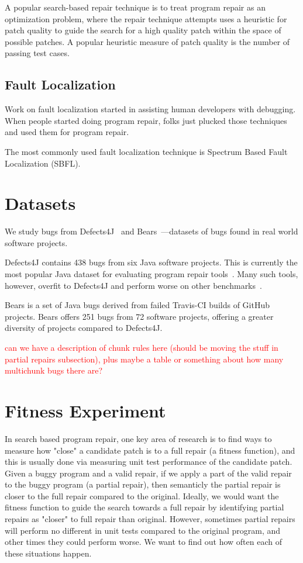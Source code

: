 \documentclass[sigconf, timestamp-false, anonymous=true]{acmart}
\newcommand\todo[1]{\textcolor{red}{#1}}
\begin{document}
A popular search-based repair technique is to treat program repair as an optimization 
problem, where the repair technique attempts uses a heuristic for patch quality to guide 
the search for a high quality patch within the space of possible patches. A popular heuristic
measure of patch quality is the number of passing test cases.

\subsection{Fault Localization}

Work on fault localization started in assisting human developers with debugging. When people started doing program repair, folks just plucked those techniques and used them for program repair. 

The most commonly used fault localization technique is Spectrum Based Fault Localization (SBFL). 

\section{Datasets}
We study bugs from Defects4J~\cite{defects4j} and Bears~\cite{bears}---datasets of 
bugs found in real world software projects.

Defects4J contains 438 bugs from six Java software projects. This  
is currently the most popular Java dataset for evaluating program repair tools~\cite{durieux-repair-them-all}.
Many such tools, however, overfit to Defects4J and perform worse on other 
benchmarks~\cite{durieux-repair-them-all}. 

Bears is a set of Java bugs derived from failed Travis-CI builds of GitHub projects.
Bears offers 251 bugs from 72 software projects, offering a greater diversity of 
projects compared to Defects4J.

\todo{can we have a description of chunk rules here (should be moving the stuff in partial repairs subsection), plus maybe a table or something about how many multichunk bugs there are?}

\section{Fitness Experiment}

In search based program repair, one key area of research is to find ways to measure how "close" a candidate patch is to a full repair (a fitness function),
and this is usually done via measuring unit test performance of the candidate patch. 
Given a buggy program and a valid repair, if we apply a part of the valid repair to the buggy program (a partial repair), then semanticly the partial repair is closer to the full repair compared to the original. 
Ideally, we would want the fitness function to guide the search towards a full repair by identifying partial repairs as "closer" to full repair than original.
However, sometimes partial repairs will perform no different in unit tests compared to the original program, and other times they could perform worse. We want to find out how often each of these situations happen.
\end{document}
